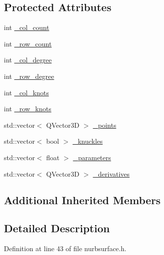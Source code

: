 \subsection*{Protected Attributes}
\begin{DoxyCompactItemize}
\item 
int \hyperlink{classShipCAD_1_1NURBSurface_aac0a2d528cec007b0fb6a154f3a67672}{\-\_\-col\-\_\-count}
\item 
int \hyperlink{classShipCAD_1_1NURBSurface_a251739da98a877b8d68722db5aa59371}{\-\_\-row\-\_\-count}
\item 
int \hyperlink{classShipCAD_1_1NURBSurface_a0192ed41981e4a3525f52be71ceb0e7c}{\-\_\-col\-\_\-degree}
\item 
int \hyperlink{classShipCAD_1_1NURBSurface_a0c53705ad7cc3004e60398f38909f59e}{\-\_\-row\-\_\-degree}
\item 
int \hyperlink{classShipCAD_1_1NURBSurface_a2b0e2649a54a57a9ae6fbeed031b04d0}{\-\_\-col\-\_\-knots}
\item 
int \hyperlink{classShipCAD_1_1NURBSurface_a3799680ea0e67d5d6c1a694f378e70ed}{\-\_\-row\-\_\-knots}
\item 
std\-::vector$<$ Q\-Vector3\-D $>$ \hyperlink{classShipCAD_1_1NURBSurface_a371421f0aec85ad3cffc3dbeeb0b26e4}{\-\_\-points}
\item 
std\-::vector$<$ bool $>$ \hyperlink{classShipCAD_1_1NURBSurface_a6f1765a2698b4ed79f0d110409129c28}{\-\_\-knuckles}
\item 
std\-::vector$<$ float $>$ \hyperlink{classShipCAD_1_1NURBSurface_a6de7536d23d408368f2df4470c1514af}{\-\_\-parameters}
\item 
std\-::vector$<$ Q\-Vector3\-D $>$ \hyperlink{classShipCAD_1_1NURBSurface_a6fa7cce7b1c78fc8fc89be24cba4d9b0}{\-\_\-derivatives}
\end{DoxyCompactItemize}
\subsection*{Additional Inherited Members}


\subsection{Detailed Description}


Definition at line 43 of file nurbsurface.\-h.



